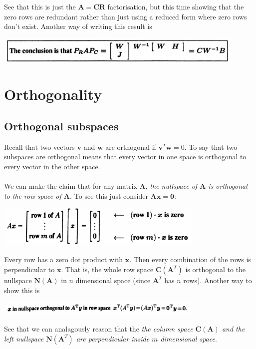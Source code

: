 \documentclass{report}
\begin{document}
See that this is just the $\bm A=\bm{CR}$ factorisation, but this time showing that the zero rows are redundant rather than just using a reduced form where zero rows don't
exist. Another way of writing this result is
\begin{center}
\includegraphics[width=12cm]{48}
\end{center}
\newpage

\chapter{Orthogonality}

\section{Orthogonal subspaces}
Recall that two vectors $\bm v$ and $\bm w$ are orthogonal if $\bm v^T\bm w=0$. To say that two subspaces are orthogonal means that every vector in one space
is orthogonal to every vector in the other space.\\
\vspace{1mm}\\
We can make the claim that for any matrix $\bm A$, \textit{the nullspace of $\bm A$ is orthogonal to the row space of $\bm A$.} To see this just consider $\bm{Ax}=\bm0$:
\begin{center}
\includegraphics[width=10cm]{49}
\end{center}
Every row has a zero dot product with $\bm x$. Then every combination of the rows is perpendicular to $\bm x$. That is, the whole row space $\bm C(\bm A^T)$ is orthogonal to 
the nullspace $\bm N(\bm A)$ in $n$ dimensional space (since $\bm A^T$ has $n$ rows). Another way to show this is
\begin{center}
\includegraphics[width=10cm]{50}
\end{center}
See that we can analagously reason that the \textit{the column space $\bm C(\bm A)$ and the left nullspace $\bm N(\bm A^T)$ are perpendicular inside $m$ dimensional space}.\\
\end{document}
